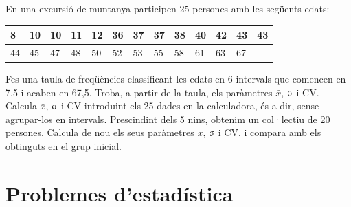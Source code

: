 \begin{mylist}
	
\exer[1]  En una excursió de muntanya participen 25 persones amb les següents edats: 
\begin{center}
	\begin{tabular}{|p{0.27in}|p{0.27in}|p{0.27in}|p{0.27in}|p{0.27in}|p{0.27in}|p{0.27in}|p{0.27in}|p{0.27in}|p{0.27in}|p{0.27in}|p{0.27in}|p{0.27in}|} \hline
		8 & 10 & 10 & 11& 12& 36& 37& 37& 38& 40& 42& 43& 43 \\ \hline  
		44 & 45 & 47 & 48& 50& 52& 53& 55& 58& 61& 63& 67&  \\ \hline 
\end{tabular}
\end{center}
\begin{tasks}
\task Fes una taula de freqüències classificant les edats en 6 intervals que comencen en 7,5 i acaben en 67,5. Troba, a partir de la taula, els paràmetres $\bar{x}$, $\sigmaup$  i CV.
\task Calcula $\bar{x}$, $\sigmaup$  i CV  introduint els 25 dades en la calculadora, és a dir, sense agrupar-los en intervals.
\task Prescindint dels 5 nins, obtenim un col·lectiu de 20 persones. Calcula de nou els seus paràmetres $\bar{x}$, $\sigmaup$ i CV,  i compara amb els obtinguts en el grup inicial.
\end{tasks}

\answers[cols=1]{[$\bar x=40.5$; $\sigma=16.5$; $CV=0.407$,  $\bar x=40.4$; $\sigma=17.11$; $CV=0.424$, $\bar x=46.5$; $\sigma=9.74$; $CV=0.21$ \par \ggblink{https://goo.gl/JfqFSu}]}

\end{mylist}


\newpage

 \section{Problemes d'estadística}

